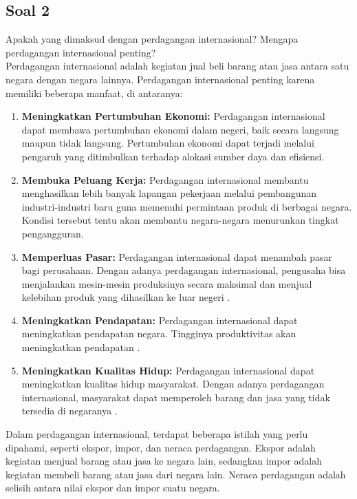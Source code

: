 \documentclass[12pt]{article}
\begin{document}
\subsection*{Soal 2}
\noindent
Apakah yang dimaksud dengan perdagangan internasional? Mengapa perdagangan internasional penting?\\

Perdagangan internasional adalah kegiatan jual beli barang atau jasa antara satu negara dengan negara lainnya\autocite{yogasukmana2023}. Perdagangan internasional penting karena memiliki beberapa manfaat, di antaranya:

\begin{enumerate}
    \item \textbf{Meningkatkan Pertumbuhan Ekonomi:} Perdagangan internasional dapat membawa pertumbuhan ekonomi dalam negeri, baik secara langsung maupun tidak langsung. Pertumbuhan ekonomi dapat terjadi melalui pengaruh yang ditimbulkan terhadap alokasi sumber daya dan efisiensi\autocite{aamSlamet2021}.

    \item \textbf{Membuka Peluang Kerja:} Perdagangan internasional membantu menghasilkan lebih banyak lapangan pekerjaan melalui pembangunan industri-industri baru guna memenuhi permintaan produk di berbagai negara. Kondisi tersebut tentu akan membantu negara-negara menurunkan tingkat pengangguran\autocite{nugroho2021}.

    \item \textbf{Memperluas Pasar:} Perdagangan internasional dapat menambah pasar bagi perusahaan. Dengan adanya perdagangan internasional, pengusaha bisa menjalankan mesin-mesin produksinya secara maksimal dan menjual kelebihan produk yang dihasilkan ke luar negeri \autocite{nugroho2021}.

    \item \textbf{Meningkatkan Pendapatan:} Perdagangan internasional dapat meningkatkan pendapatan negara. Tingginya produktivitas akan meningkatkan pendapatan \autocite{nugroho2021}.

    \item \textbf{Meningkatkan Kualitas Hidup:} Perdagangan internasional dapat meningkatkan kualitas hidup masyarakat. Dengan adanya perdagangan internasional, masyarakat dapat memperoleh barang dan jasa yang tidak tersedia di negaranya \autocite{rosyda2021}.
\end{enumerate}


Dalam perdagangan internasional, terdapat beberapa istilah yang perlu dipahami, seperti ekspor, impor, dan neraca perdagangan. Ekspor adalah kegiatan menjual barang atau jasa ke negara lain, sedangkan impor adalah kegiatan membeli barang atau jasa dari negara lain. Neraca perdagangan adalah selisih antara nilai ekspor dan impor suatu negara\autocite{Aflah2023KeterkaitanHP}.
\end{document}
